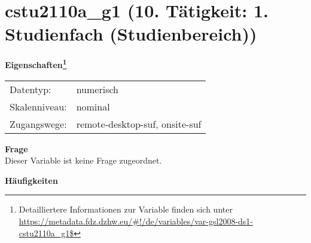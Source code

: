 
    \setcounter{footnote}{0}

    \vspace*{-1.8cm}
	\section{cstu2110a\_g1 (10. Tätigkeit: 1. Studienfach (Studienbereich))}
	\label{section:cstu2110a_g1}



    \vspace*{0.5cm}
    \noindent\textbf{Eigenschaften\footnote{Detailliertere Informationen zur Variable finden sich unter
		\url{https://metadata.fdz.dzhw.eu/\#!/de/variables/var-gsl2008-ds1-cstu2110a_g1$}}}\\
	\begin{tabularx}{\hsize}{@{}lX}
	Datentyp: & numerisch \\
	Skalenniveau: & nominal \\
	Zugangswege: &
	  remote-desktop-suf, 
	  onsite-suf
 \\
    \end{tabularx}



		\vspace*{0.5cm}
		\noindent\textbf{Frage}\\
		Dieser Variable ist keine Frage zugeordnet.





        		\vspace*{0.5cm}
                \noindent\textbf{Häufigkeiten}

